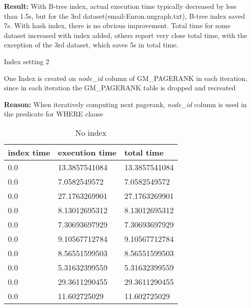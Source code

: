 \begin{itemize*}
\par \textbf{Result:} With B-tree index, actual execution time typically decreased by less than 1.5s, but for the 3rd dataset(email-Enron.ungraph.txt), B-tree index saved 7s. With hash index, there is no obvious improvement. Total time for some dataset increased with index added, others report very close total time, with the exception of the 3rd dataset, which saves 5s in total time.
\item{Index setting 2}
\par One Index is created on \textit{node\_id} column of GM\_PAGERANK in each iteration, since in each iteration the GM\_PAGERANK table is dropped and recreated
\par \textbf{Reason:} When iteratively computing next pagerank, \textit{node\_id} column is used in the predicate for WHERE clause

\begin{table}[H]
\begin{center}
\begin{tabular}{|l|l|l|}
\hline
index time & execution time & total time     \\ \hline
0.0 & 13.3857541084 & 13.3857541084 \\ \hline
0.0 & 7.0582549572  & 7.0582549572  \\ \hline
0.0 & 27.1763269901 & 27.1763269901 \\ \hline
0.0 & 8.13012695312 & 8.13012695312 \\ \hline
0.0 & 7.30693697929 & 7.30693697929 \\ \hline
0.0 & 9.10567712784 & 9.10567712784 \\ \hline
0.0 & 8.56551599503 & 8.56551599503 \\ \hline
0.0 & 5.31632399559 & 5.31632399559 \\ \hline
0.0 & 29.3611290455 & 29.3611290455 \\ \hline
0.0 & 11.602725029  & 11.602725029  \\ \hline
\end{tabular}
\end{center}
\caption{No index}
\end{table}


\end{itemize*}
